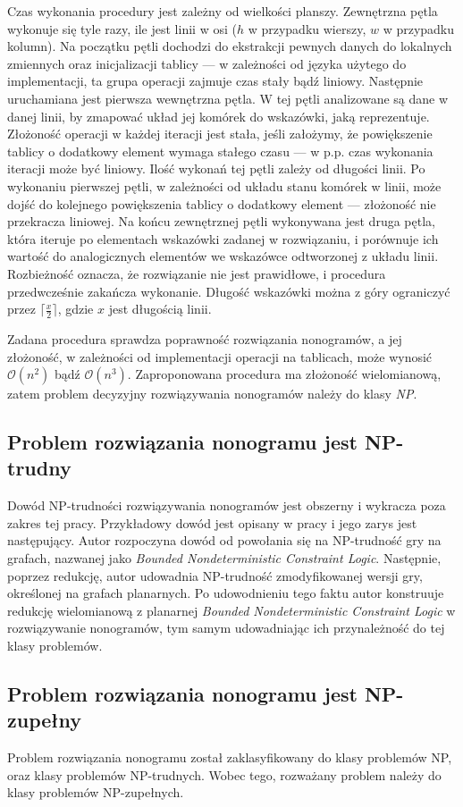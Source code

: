     Czas wykonania procedury jest zależny od wielkości planszy. Zewnętrzna pętla wykonuje się
tyle razy, ile jest linii w osi ($h$ w przypadku wierszy, $w$ w przypadku kolumn). Na początku pętli
dochodzi do ekstrakcji pewnych danych do lokalnych zmiennych oraz inicjalizacji tablicy — w zależności
od języka użytego do implementacji, ta grupa operacji zajmuje czas stały bądź liniowy. Następnie
uruchamiana jest pierwsza wewnętrzna pętla. W tej pętli analizowane są dane w danej linii, by zmapować
układ jej komórek do wskazówki, jaką reprezentuje. Złożoność operacji w każdej iteracji jest stała,
jeśli założymy, że powiększenie tablicy o dodatkowy element wymaga stałego czasu — w p.p. czas wykonania
iteracji może być liniowy. Ilość wykonań tej pętli zależy od długości linii.
Po wykonaniu pierwszej pętli, w zależności od układu stanu komórek w linii,
może dojść do kolejnego powiększenia tablicy o dodatkowy element — złożoność nie przekracza liniowej.
Na końcu zewnętrznej pętli wykonywana jest druga pętla, która iteruje po elementach wskazówki zadanej
w rozwiązaniu, i porównuje ich wartość do analogicznych elementów we wskazówce odtworzonej z układu linii.
Rozbieżność oznacza, że rozwiązanie nie jest prawidłowe, i procedura przedwcześnie zakańcza wykonanie.
Długość wskazówki można z góry ograniczyć przez $\lceil \frac{x}{2} \rceil$, gdzie $x$ jest długością
linii.

    Zadana procedura sprawdza poprawność rozwiązania nonogramów, a jej złożoność, w zależności od
implementacji operacji na tablicach, może wynosić $\mathcal{O}(n^2)$ bądź $\mathcal{O}(n^3)$.
Zaproponowana procedura ma złożoność wielomianową, zatem problem decyzyjny rozwiązywania nonogramów
należy do klasy \textit{NP}.


\subsection{Problem rozwiązania nonogramu jest NP-trudny}
    Dowód NP-trudności rozwiązywania nonogramów jest obszerny i wykracza poza zakres tej pracy.
Przykładowy dowód jest opisany w pracy \cite{Nonograms-NP-Hard} i jego zarys jest następujący.
Autor rozpoczyna dowód od powołania się na NP-trudność gry na grafach, nazwanej jako
\textit{Bounded Nondeterministic Constraint Logic}. Następnie, poprzez redukcję, autor udowadnia 
NP-trudność zmodyfikowanej wersji gry, określonej na grafach planarnych. Po udowodnieniu tego faktu
autor konstruuje redukcję wielomianową z planarnej \textit{Bounded Nondeterministic Constraint Logic}
w rozwiązywanie nonogramów, tym samym udowadniając ich przynależność do tej klasy problemów.


\subsection{Problem rozwiązania nonogramu jest NP-zupełny}
    Problem rozwiązania nonogramu został zaklasyfikowany do klasy problemów NP, oraz klasy problemów
NP-trudnych. Wobec tego, rozważany problem należy do klasy problemów NP-zupełnych.
